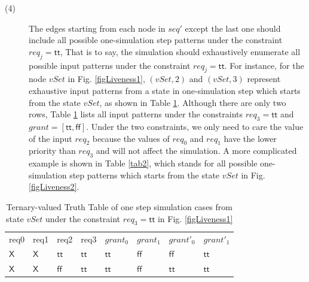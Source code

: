 \documentclass[final]{IEEEtran}
\begin{document}
\begin{description}
\item[(4)]
The edges starting from each node in $seq'$ except the
last one should include all possible one-simulation step patterns
under the constraint $req_j=\mathsf{tt}$, That is to say, the
simulation should exhaustively enumerate all possible input patterns
under the constraint $req_j=\mathsf{tt}$. For instance, for the node
$vSet$ in Fig. \ref{figLiveness1}, $(vSet,2)$ and $(vSet,3)$
represent exhaustive
 input patterns from a state in one-simulation step which starts from the state $vSet$, as
shown in Table \ref{tab1}. %
Although there are only two rows, Table \ref{tab1} lists all input
patterns under the constraints $req_3=\mathsf{tt}$ and
$grant=[\mathsf{tt},\mathsf{ff}]$. Under the two constraints, we
only need to care the value of the input $req_2$ because the values of
$req_0$ and $req_1$ have the lower priority than $req_3$ and will
not affect the simulation. A more complicated example is shown in Table
\ref{tab2}, which stands for all possible one-simulation  step
patterns which starts from the state $vSet$ in Fig.
\ref{figLiveness2}.

\end{description}




\begin{center}
\begin{table}[tbp]
\caption{Ternary-valued Truth Table of one step simulation cases
from state $vSet$ under the constraint $req_3=\mathsf{tt}$ in Fig.
\ref{figLiveness1}} \label{tab1}
\begin{center}
\begin{tabular}{llllllll}
req0 & req1 & req2 & req3 & $grant_0$ & $grant_1$ & $grant'_0$ & $grant'_1$ \\


$\mathsf{X}$ & $\mathsf{X}$ & $\mathsf{tt}$ & $\mathsf{tt}$ &
$\mathsf{tt}$ &
$\mathsf{ff}$ & $\mathsf{ff}$ & $\mathsf{tt}$ \\

$\mathsf{X}$ & $\mathsf{X}$ & $\mathsf{ff}$ & $\mathsf{tt}$ &
$\mathsf{tt}$ & $\mathsf{ff}$ & $\mathsf{tt}$ & $\mathsf{tt}$


\end{tabular}%
\end{center}
\end{table}
\end{center}
\end{document}
